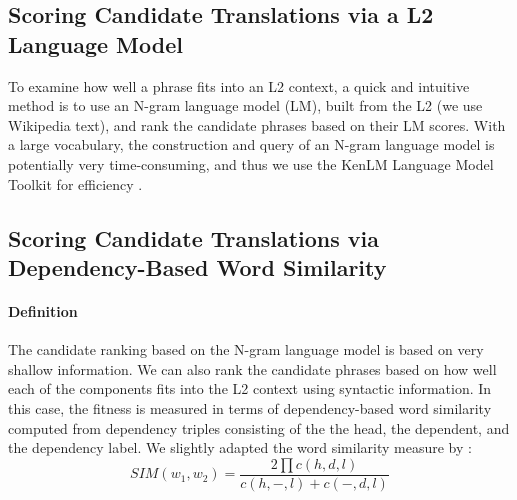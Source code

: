 \documentclass[11pt]{article}
\begin{document}


\subsection{Scoring Candidate Translations via a L2 Language Model}
\label{sec:l2model}

To examine how well a phrase fits into an L2 context, a quick and intuitive method is to use an N-gram language model (LM), built from the L2 (we use Wikipedia text), and rank the candidate phrases based on their LM scores. With a large vocabulary, the construction and query of an N-gram language model is potentially very time-consuming, and thus we use the KenLM Language Model Toolkit for efficiency \cite{heafield:kenlm:11}.


\subsection{Scoring Candidate Translations via Dependency-Based Word Similarity}
\label{sec:dependencySIM}

\paragraph{Definition} The candidate ranking based on the N-gram language model is based on very shallow information. We can also rank the candidate phrases based on how well each of the components fits into the L2 context using syntactic information. In this case, the fitness is measured in terms of dependency-based word similarity computed from dependency triples consisting of the the head, the dependent, and the dependency label. We slightly adapted the word similarity measure by :
\begin{equation}
SIM(w_1,w_2) = \frac{2 \prod c(h,d,l)} 
{c(h,-,l) + c(-,d,l)}
\end{equation}
\end{document}
